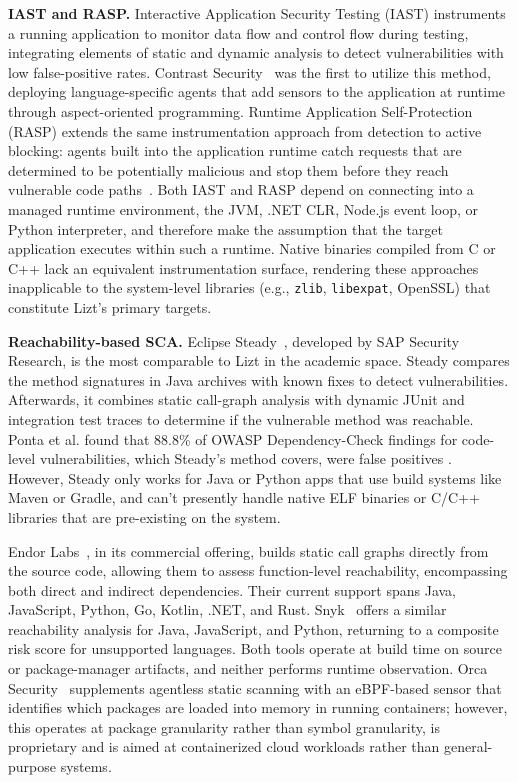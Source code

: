 \documentclass[conference]{IEEEtran}
\begin{document}
\textbf{IAST and RASP.}
Interactive Application Security Testing (IAST) instruments a running application to monitor data flow and control flow during testing, integrating elements of static and dynamic analysis to detect vulnerabilities with low false-positive rates. Contrast Security~\cite{contrast_iast} was the first to utilize this method, deploying language-specific agents that add sensors to the application at runtime through aspect-oriented programming. Runtime Application Self-Protection (RASP) extends the same instrumentation approach from detection to active blocking: agents built into the application runtime catch requests that are determined to be potentially malicious and stop them before they reach vulnerable code paths~\cite{gartner_rasp}. Both IAST and RASP depend on connecting into a managed runtime environment, the JVM, .NET CLR, Node.js event loop, or Python interpreter, and therefore make the assumption that the target application executes within such a runtime. Native binaries compiled from C or C++ lack an equivalent instrumentation surface, rendering these approaches inapplicable to the system-level libraries (e.g., \texttt{zlib}, \texttt{libexpat}, OpenSSL) that constitute Lizt's primary targets.

\textbf{Reachability-based SCA.}
Eclipse Steady~\cite{steady}, developed by SAP Security Research, is the most comparable to Lizt in the academic space. Steady compares the method signatures in Java archives with known fixes to detect vulnerabilities. Afterwards, it combines static call-graph analysis with dynamic JUnit and integration test traces to determine if the vulnerable method was reachable. Ponta et al. found that 88.8\% of OWASP Dependency-Check findings for code-level vulnerabilities, which Steady's method covers, were false positives \cite{ponta2020}. However, Steady only works for Java or Python apps that use build systems like Maven or Gradle, and can't presently handle native ELF binaries or C/C++ libraries that are pre-existing on the system.

Endor Labs~\cite{endorlabs}, in its commercial offering, builds static call graphs directly from the source code, allowing them to assess function-level reachability, encompassing both direct and indirect dependencies. Their current support spans Java, JavaScript, Python, Go, Kotlin, .NET, and Rust. Snyk~\cite{snyk} offers a similar reachability analysis for Java, JavaScript, and Python, returning to a composite risk score for unsupported languages. Both tools operate at build time on source or package-manager artifacts, and neither performs runtime observation. Orca Security~\cite{orca} supplements agentless static scanning with an eBPF-based sensor that identifies which packages are loaded into memory in running containers; however, this operates at package granularity rather than symbol granularity, is proprietary and is aimed at containerized cloud workloads rather than general-purpose systems.
\end{document}
